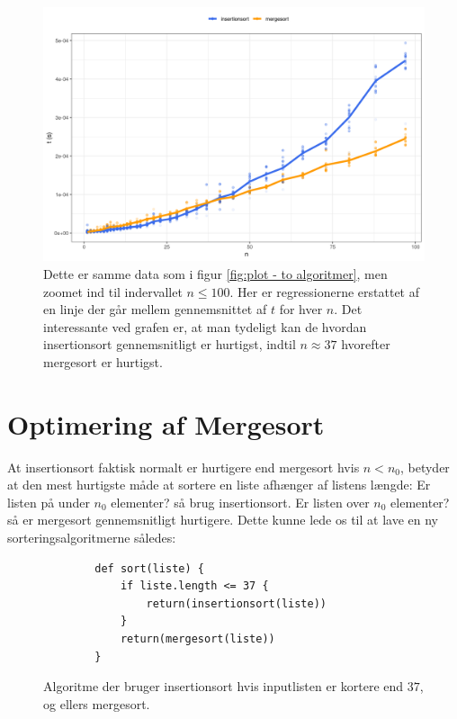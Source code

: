 \begin{figure}
	\begin{center}
		\includegraphics[scale=0.6]{../img/toAlgoritmerZoomedGns.png}
	\end{center}
	\caption{Dette er samme data som i figur \ref{fig:plot - to algoritmer}, men zoomet ind til indervallet $n \leq 100$. Her er regressionerne erstattet af en linje der går mellem gennemsnittet af $t$ for hver $n$. Det interessante ved grafen er, at man tydeligt kan de hvordan insertionsort gennemsnitligt er hurtigst, indtil $n \approx 37$ hvorefter mergesort er hurtigst.}
	\label{fig:toAlgoritmerZoomedGns}
\end{figure}

\section{Optimering af Mergesort}%
\label{sub:Optimering af Mergesort}

At insertionsort faktisk normalt er hurtigere end mergesort hvis $n < n_0$, betyder at den mest hurtigste måde at sortere en liste afhænger af listens længde: Er listen på under $n_0$ elementer? så brug insertionsort. Er listen over $n_0$ elementer? så er mergesort gennemsnitligt hurtigere. Dette kunne lede os til at lave en ny sorteringsalgoritmerne således:

\begin{figure}[h]
	\begin{center}
		\begin{lstlisting}
		def sort(liste) {
			if liste.length <= 37 {
				return(insertionsort(liste))
			}
			return(mergesort(liste))
		}
		\end{lstlisting}
	\end{center}
	\vspace{-6mm}
	\caption{Algoritme der bruger insertionsort hvis inputlisten er kortere end $37$, og ellers mergesort.}
	\label{fig:hybridalgoritme1}
\end{figure}


